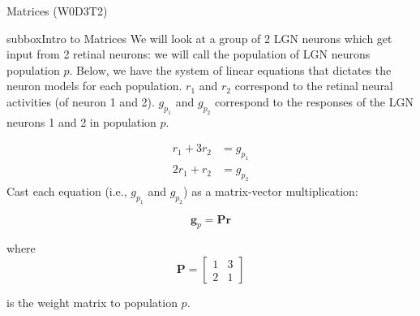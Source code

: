 \begin{textbox}{Matrices (W0D3T2)  }
\begin{subbox}{subbox}{Intro to Matrices}
\scriptsize
We will look at a group of 2 LGN neurons which get input from 2 retinal neurons: we will call the population of LGN neurons population $p$. Below, we have the system of linear equations that dictates the neuron models for each population. $r_1$ and $r_2$ correspond to the retinal neural activities (of neuron 1 and 2). $g_{p_1}$ and  $g_{p_2}$ correspond to the responses of the LGN neurons 1 and 2 in population $p$. 

\begin{align}
r_1 + 3r_2 &= g_{p_1} \\
2r_1 + r_2 &= g_{p_2} 
\end{align}
Cast each equation (i.e., $g_{p_1}$ and $g_{p_2}$) as a matrix-vector multiplication: 

\begin{equation}
\mathbf{g}_p = \mathbf{P}\mathbf{r}
\end{equation}

where \begin{equation}\mathbf{P}=
\begin{bmatrix}
1 & 3 \\
2 & 1
\end{bmatrix}
\end{equation}

is the weight matrix to population $p$. 
\end{subbox}
\end{textbox}
